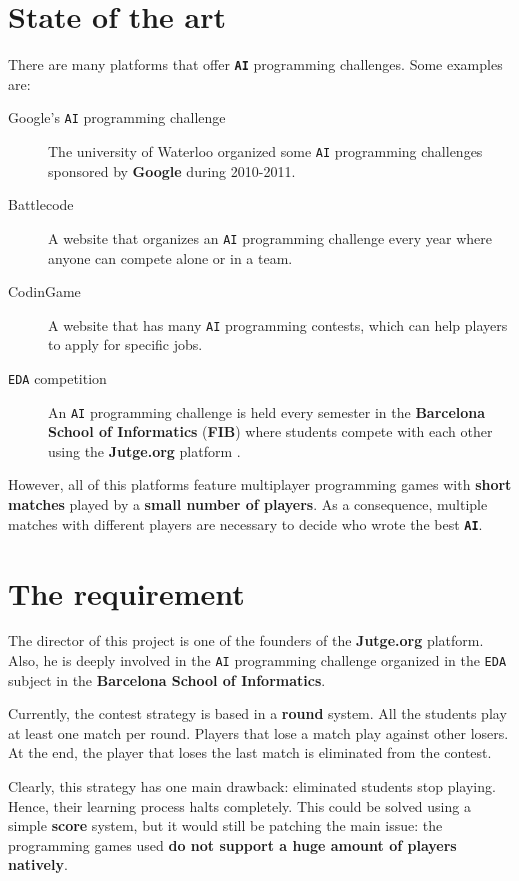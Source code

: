 \documentclass[a4paper,11pt,titlepage,abstract,numbers=noenddot,automark,mnsy,intlimits,rgb,dvipsnames]{report}
\begin{document}
\section{State of the art}
There are many platforms that offer \textbf{\texttt{AI}} programming challenges. Some examples are:
\begin{description}
\item[Google's \texttt{AI} programming challenge \cite{google_ai}]
The university of Waterloo organized some \texttt{AI} programming challenges
  sponsored by \textbf{Google} during 2010-2011.
\item[Battlecode \cite{battlecode}]
A website that organizes an \texttt{AI} programming challenge every year where anyone can
  compete alone or in a team.
\item[CodinGame \cite{codingame}]
A website that has many \texttt{AI} programming contests, which can help players to apply for
  specific jobs.
\item[\texttt{EDA} competition \cite{eda}]
An \texttt{AI} programming challenge is held every semester in the \textbf{Barcelona School of
  Informatics} (\textbf{FIB}) where students compete with each other using the \textbf{Jutge.org} platform \cite{jutge}.
\end{description}
However, all of this platforms feature multiplayer programming games with \textbf{short matches} played by a
\textbf{small number of players}. As a consequence, multiple matches with different players are necessary to decide who wrote
the best \textbf{\texttt{AI}}.
\section{The requirement}
The director of this project is one of the founders of the \textbf{Jutge.org} platform. Also, he is deeply involved in the \texttt{AI}
programming challenge organized in the \texttt{EDA} subject in the \textbf{Barcelona School of Informatics}.

Currently, the contest strategy is based in a \textbf{round} system. All the students play at least one match per round. Players
that lose a match play against other losers. At the end, the player that loses the last match is eliminated from the contest.

Clearly, this strategy has one main drawback: eliminated students stop playing. Hence, their learning process halts completely.
This could be solved using a simple \textbf{score} system, but it would still be patching the main issue: the
programming games used \textbf{do not support a huge amount of players natively}.
\end{document}
